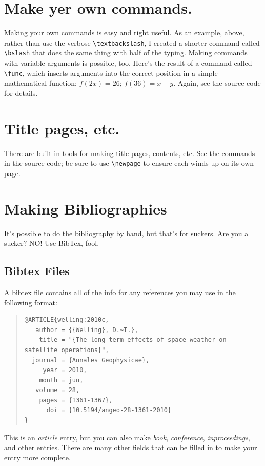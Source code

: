 \documentclass[12pt, letterpaper]{article}
\newcommand{\bslash}[0]{\textbackslash}
\newcommand{\func}[2]{$f(#1)=#2$}
\begin{document}
\section{Make yer own commands.}

Making your own commands is easy and right useful.  As an example, above, 
rather than use the verbose {\tt \bslash textbackslash}, I created a shorter 
command called {\tt \bslash bslash} that does the same thing with half of the 
typing.  Making commands with variable arguments is possible, too.  Here's the 
result of a command called {\tt \bslash func}, which inserts arguments into the
correct position in a simple mathematical function: 
\func{2x}{26}; \func{36}{x-y}.  Again, see the source code for details.

\section{Title pages, etc.}
There are built-in tools for making title pages, contents, etc.  See the
commands in the source code; be sure to use {\tt \bslash newpage} to ensure
each winds up on its own page.

\section{Making Bibliographies}
It's possible to do the bibliography by hand, but that's for suckers.  Are
you a sucker? NO!  Use BibTex, fool.  

\subsection{Bibtex Files}
A bibtex file contains all of the info for 
any references you may use in the following format:

\begin{quote}
\begin{verbatim}
@ARTICLE{welling:2010c,
   author = {{Welling}, D.~T.},
    title = "{The long-term effects of space weather on satellite operations}",
  journal = {Annales Geophysicae},
     year = 2010,
    month = jun,
   volume = 28,
    pages = {1361-1367},
      doi = {10.5194/angeo-28-1361-2010}
}
\end{verbatim}
\end{quote}

This is an {\it article} entry, but you can also make {\it book}, 
{\it conference}, {\it inproceedings}, and other entries.  There are many other
fields that can be filled in to make your entry more complete.  
\end{document}

